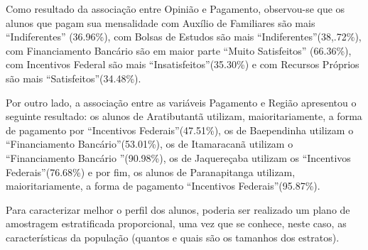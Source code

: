 Como resultado da associação entre Opinião e Pagamento, observou-se que os alunos que pagam sua mensalidade com Auxílio de Familiares são mais \textquotedblleft Indiferentes\textquotedblright 
(36.96\%), com Bolsas de Estudos são mais \textquotedblleft Indiferentes\textquotedblright (38,.72\%), com Financiamento Bancário são em maior parte \textquotedblleft Muito Satisfeitos\textquotedblright 
(66.36\%), com Incentivos Federal são mais \textquotedblleft Insatisfeitos\textquotedblright (35.30\%) e com Recursos Próprios são mais \textquotedblleft Satisfeitos\textquotedblright (34.48\%).

Por outro lado, a associação entre as variáveis Pagamento e Região apresentou o seguinte resultado: os alunos de Aratibutantã utilizam, maioritariamente, a forma de pagamento por 
\textquotedblleft Incentivos Federais\textquotedblright (47.51\%), os de Baependinha utilizam o \textquotedblleft Financiamento Bancário\textquotedblright (53.01\%), os de Itamaracanã utilizam o 
\textquotedblleft Financiamento Bancário \textquotedblright (90.98\%), os de Jaquereçaba utilizam os \textquotedblleft Incentivos Federais\textquotedblright (76.68\%) e por fim, os alunos de 
Paranapitanga utilizam, maioritariamente, a forma de pagamento \textquotedblleft Incentivos Federais\textquotedblright (95.87\%). 


Para caracterizar melhor o perfil dos alunos, poderia ser realizado um plano de amostragem estratificada proporcional, uma vez que se conhece, neste caso, as características da população (quantos e 
quais são os tamanhos dos estratos). 